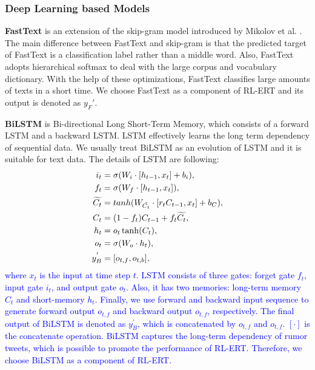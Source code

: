 \documentclass[review]{elsarticle}
\begin{document}
\subsubsection{Deep Learning based Models}

\textbf{FastText} \cite{DBLP:journals/tacl/BojanowskiGJM17, DBLP:journals/corr/JoulinGBDJM16, DBLP:conf/eacl/GraveMJB17} is an extension of the skip-gram model introduced by Mikolov et al. \cite{DBLP:conf/nips/MikolovSCCD13}. The main difference between FastText and skip-gram is that the predicted target of FastText is a classification label rather than a middle word. Also, FastText adopts hierarchical softmax to deal with the large corpus and vocabulary dictionary. With the help of these optimizations, FastText classifies large amounts of texts in a short time. We choose FastText as a component of RL-ERT and its output is denoted as $y_F'$.

\textbf{BiLSTM} \cite{DBLP:journals/neco/HochreiterS97} is Bi-directional Long Short-Term Memory, which consists of a forward LSTM and a backward LSTM. LSTM effectively learns the long term dependency of sequential data. We usually treat BiLSTM as an evolution of LSTM and it is suitable for text data. The details of LSTM are following:
\begin{align}\label{eq:lstm}
i_t &= \sigma(W_i \cdot [h_{t-1}, x_t] + b_i),\\
f_t &= \sigma(W_f \cdot [h_{t-1}, x_t]),\\
\widetilde{C_t} &= tanh(W_{\tilde{C_t}} \cdot [r_t C_{t-1}, x_t]  + b_C),\\
C_t &= (1-f_t) C_{t-1} + f_t \widetilde{C_t},\\
h_t &=o_t \* \tanh(C_t),\\
o_t &=  \sigma(W_o \cdot h_t),\\
y_B^{'} &= [o_{t,f}, o_{t,b}],
\end{align}
\textcolor{blue}{where $x_t$ is the input at time step $t$. LSTM consists of three gates: forget gate $f_t$, input gate $i_t$, and output gate $o_t$. Also, it has two memories: long-term memory $C_t$ and short-memory $h_t$. Finally, we use forward and backward input sequence to generate forward output $o_{t,f}$ and backward output $o_{t,f}$, respectively. The final output of BiLSTM is denoted as $y_B^{'}$, which is concatenated by $o_{t,f}$ and $o_{t,f}$. $[\cdot]$ is the concatenate operation. BiLSTM captures the long-term dependency of rumor tweets, which is possible to promote the performance of RL-ERT. Therefore, we choose BiLSTM as a component of RL-ERT.}
\end{document}
